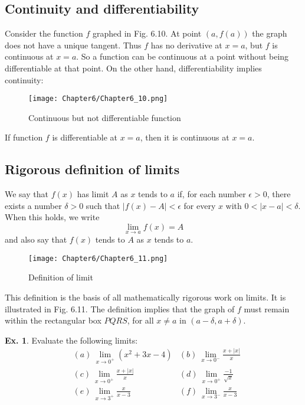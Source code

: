 \documentclass[10pt,a4paper]{book}
\theoremstyle{definition}\newtheorem{definition}{Definition}
\theoremstyle{definition}\newtheorem{fact}{Fact}
\theoremstyle{definition}\newtheorem{ex}{Ex.}
\theoremstyle{definition}\newtheorem{project}{Project}
\theoremstyle{definition}\newtheorem{problem}{Problem}
\theoremstyle{definition}\newtheorem{example}{Example}
\numberwithin{theorem}{chapter}
\numberwithin{corollary}{chapter}
\numberwithin{assumption}{chapter}
\numberwithin{definition}{chapter}
\numberwithin{prop}{chapter}
\numberwithin{notation}{chapter}
\numberwithin{problem}{chapter}
\numberwithin{example}{chapter}
\numberwithin{fact}{chapter}
\numberwithin{ex}{chapter}
\begin{document}
	\subsection{Continuity and differentiability}
	
	Consider the function $f$ graphed in Fig. 6.10. At point $(a, f (a))$ the graph does not have a unique tangent. Thus $f$ has no derivative at $x = a$, but $f$ is continuous at $x = a$. So a function can be continuous at a point without being differentiable at that point. On the other hand, differentiability implies continuity:
	\begin{figure}[H]
		\centering
		\texttt{[image: Chapter6/Chapter6\_10.png]}
		\caption{Continuous but not differentiable function}
	\end{figure}
	
	If function $f$ is differentiable at $x = a$, then it is continuous at $x = a$.
	
	\subsection{Rigorous definition of limits}
	
	We say that $f(x)$ has limit $A$ as $x$ tends to $a$ if, for each number $\epsilon > 0$, there exists a number $\delta > 0$ such that $|f (x) - A| < \epsilon$ for every $x$ with $0 < |x - a| < \delta$.
	When this holds, we write
	$$\lim_{x\rightarrow a}f(x) = A$$
	and also say that $f(x)$ tends to $A$ as $x$ tends to $a$.
	
	\begin{figure}[H]
		\centering
		\texttt{[image: Chapter6/Chapter6\_11.png]}
		\caption{Definition of limit}
	\end{figure}
	
	This definition is the basis of all mathematically rigorous work on limits. It is illustrated in Fig. 6.11. The definition implies that the graph of $f$ must remain within the rectangular box $PQRS$, for all $x \neq a$ in $(a - \delta, a + \delta)$.
	
	\begin{ex}
		Evaluate the following limits:
		\begin{align*}
			& (a) \ \lim_{x \rightarrow 0^{+}}(x^2+3x-4)          
			& (b) \ \lim_{x \rightarrow 0^{-}}\frac{x+|x|}{x}     \\
			& (c) \ \lim_{x \rightarrow 0^{+}}\frac{x+|x|}{x}     
			& (d) \ \lim_{x \rightarrow 0^{+}}\frac{-1}{\sqrt{x}} \\
			& (e) \ \lim_{x \rightarrow 3^{+}}\frac{x}{x-3}       
			& (f) \ \lim_{x \rightarrow 3^{-}}\frac{x}{x-3}       \\
		\end{align*}
	\end{ex}
	
\end{document}
